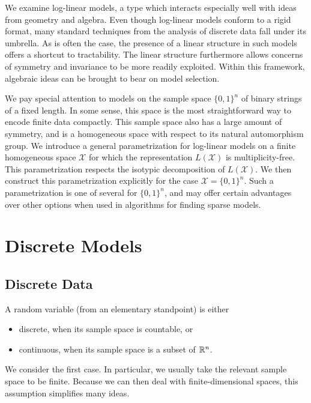 \documentclass[cclicense]{hmcthesis}
\providecommand*{\xs}{\mathcal X}
\numberwithin{equation}{chapter}
\numberwithin{thmcounter}{chapter}
\begin{document}
    We examine log-linear models, a type which interacts especially well with
    ideas from geometry and algebra.  Even though log-linear models conform to a
    rigid format, many standard techniques from the analysis of discrete data
    fall under its umbrella.  As is often the case, the presence of a linear
    structure in such models offers a shortcut to tractability.  The linear
    structure furthermore allows concerns of symmetry and invariance to be more
    readily exploited.  Within this framework, algebraic ideas can be brought to
    bear on model selection.

    We pay special attention to models on the sample space $\{0, 1\}^n$ of
    binary strings of a fixed length.  In some sense, this space is the most
    straightforward way to encode finite data compactly.  This sample space also
    has a large amount of symmetry, and is a homogeneous space with respect to
    its natural automorphism group.  We introduce a general parametrization for
    log-linear models on a finite homogeneous space $\xs$ for which the
    representation $L(\xs)$ is multiplicity-free.  This parametrization respects
    the isotypic decomposition of $L(\xs)$.  We then construct this
    parametrization explicitly for the case $\xs = \{0, 1\}^n$.  Such a
    parametrization is one of several for $\{0, 1\}^n$, and may offer certain
    advantages over other options when used in algorithms for finding sparse
    models.

\chapter{Discrete Models}

    \section{Discrete Data}

    A random variable (from an elementary standpoint) is either 
    \begin{itemize}\noparspace
    \item discrete, when its sample space is countable, or
    \item continuous, when its sample space is a subset of $\mathbb{R}^n$.
    \end{itemize}
    We consider the first case.  In particular, we usually take the relevant
    sample space to be finite.  Because we can then deal with
    finite-dimensional spaces, this assumption simplifies many ideas.
\end{document}
